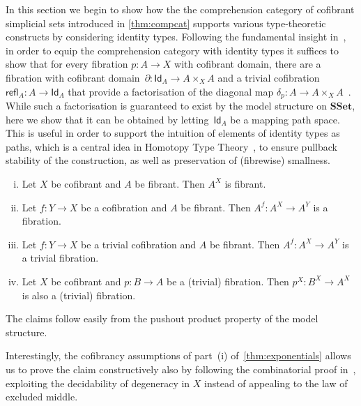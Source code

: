 \documentclass[reqno,10pt,a4paper,oneside,draft]{amsart}
\makeatletter
\renewenvironment{proof}[1][\proofname] {\par\pushQED{\qed}\normalfont\topsep6\p@\@plus6\p@\relax\trivlist\item[\hskip\labelsep\bf#1\@addpunct{.}]\ignorespaces}{\popQED\endtrivlist\@endpefalse}
\numberwithin{equation}{section}
\theoremstyle{mythm}
\theoremstyle{mydef}
\theoremstyle{myrmk}
\newcommand{\co}{\colon}
\newcommand{\SSet}{\mathbf{SSet}}
\newcommand{\Id}{\mathsf{Id}}
\makeatother
\begin{document}
In this section we begin to show how the the comprehension category of cofibrant simplicial
sets introduced in \cref{thm:compcat} supports 
various type-theoretic constructs by considering identity types. Following the fundamental insight in~\cite{awodey-warren:homotopy-idtype}, in order to equip the comprehension category  with identity types it suffices to show that
for every fibration $p \co A \to X$ with cofibrant domain, there are a  fibration with cofibrant domain~$\partial \co \Id_A \to A \times_X A$ and a trivial cofibration $\mathsf{refl}_A \co A \to \Id_A$ that provide a factorisation of the diagonal map $\delta_p \co A \to A \times_X A$~\cite{LumsdaineP:locuoc}. While such a factorisation is guaranteed to exist by the model structure on $\SSet$, here we show that it can be obtained by letting~$\Id_A$ be a mapping path space. 
This is useful in order to support the intuition of elements of identity types as paths, which is a central idea in Homotopy Type Theory~\cite{hottbook}, to ensure pullback stability
of the construction, as well as preservation of (fibrewise) smallness.



\begin{lemma} \hfill 
 \label{thm:exponentials}
\begin{enumerate}[(i)] 
\item Let $X$ be cofibrant and $A$ be fibrant.  Then $A^X$ is fibrant.
\item Let $f \co Y \rightarrow X$ be a cofibration and $A$ be fibrant. Then $A^f \co A^X \rightarrow A^Y$ is a fibration.
\item Let $f \co Y \rightarrow X$ be a trivial cofibration and $A$ be fibrant.  Then $A^f \co A^X \rightarrow A^Y$ is a trivial fibration.
\item Let $X$ be cofibrant and $p \co B \rightarrow A$ be a (trivial) fibration. Then $p^X \co B^X \rightarrow A^X$ is also a (trivial) fibration.
\end{enumerate}
\end{lemma}

\begin{proof} The claims follow easily from the pushout product property of the model structure.
\end{proof}
 
Interestingly, the cofibrancy assumptions of part~(i) of~\cref{thm:exponentials} allows
us to prove the claim constructively also by following the combinatorial proof in~\cite{MayJP:simoat}, exploiting the decidability of degeneracy in $X$ instead of appealing to the law of excluded middle.
\end{document}
